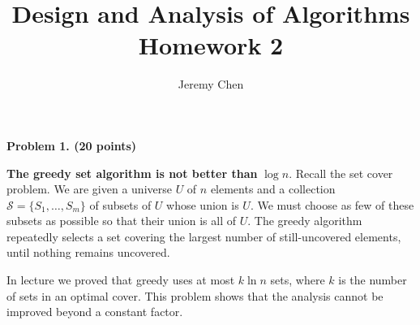 \documentclass[10pt,letterpaper]{article}
\title{Design and Analysis of Algorithms Homework 2}
\author{Jeremy Chen}
\begin{document}
	\maketitle

\noindent\textbf{Problem 1. \hfill (20 points)} 

\noindent\textbf{The greedy set algorithm is not better than} $\log n$. Recall the set cover problem. We are given a universe $U$ of $n$ elements and a collection $\mathcal{S} = \{ S_{1}, \dots, S_{m} \}$ of subsets of $U$ whose union is $U$. We must choose as few of these subsets as possible so that their union is all of $U$. The greedy algorithm repeatedly selects a set covering the largest number of still-uncovered elements, until nothing remains uncovered.

In lecture we proved that greedy uses at most $k\ln n$ sets, where $k$ is the number of sets in an optimal cover. This problem shows that the analysis cannot be improved beyond a constant factor. 
\end{document}
